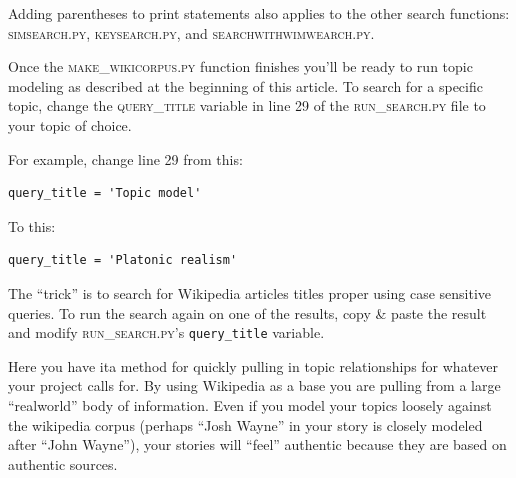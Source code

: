  Adding parentheses to print statements also applies to the other search functions: \textsc{simsearch.py}, \textsc{keysearch.py}, and \textsc{searchwithwimwearch.py}.

Once the \textsc{make\_wikicorpus.py} function finishes you'll be ready to run
topic modeling as described at the beginning of this article. To search for a
specific topic, change the \textsc{query\_title} variable in line 29 of the
\textsc{run\_search.py} file to your topic of choice.

For example, change line 29 from this:
\begin{lstlisting}
query_title = 'Topic model'
\end{lstlisting}
To this:
\begin{lstlisting}
query_title = 'Platonic realism'
\end{lstlisting}
The ``trick'' is to search for Wikipedia articles titles proper using case
sensitive queries. To run the search again on one of the results, copy \&
paste the result and modify \textsc{run\_search.py}'s \texttt{query\_title}
variable.

Here you have it\textemdash a method for quickly pulling in topic relationships
for whatever your project calls for. By using Wikipedia as a base you are
pulling from a large ``real\textemdash world'' body of information. Even if you
model your topics loosely against the wikipedia corpus (perhaps ``Josh Wayne'' in your story is
closely modeled after ``John Wayne''), your stories
will ``feel'' authentic because they are based on authentic sources.